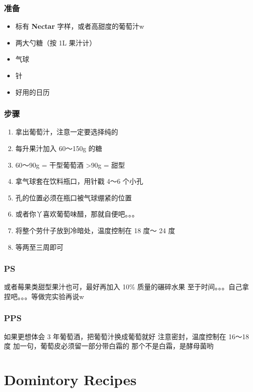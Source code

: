 \documentclass[12pt, a4paper]{ctexart}
\begin{document}
\subsubsection{准备}
\begin{itemize}
    \item{标有 \textbf{Nectar} 字样，或者高甜度的葡萄汁w}
    \item{两大勺糖（按 1L 果汁计）}
    \item{气球}
    \item{针}
    \item{好用的日历}
\end{itemize}

\subsubsection{步骤}
\begin{enumerate}[start=0]
    \item{拿出葡萄汁，注意一定要选择纯的}
    \item{每升果汁加入 60～150g 的糖}
    \item{60～90g = 干型葡萄酒 >90g = 甜型}
    \item{拿气球套在饮料瓶口，用针戳 4～6 个小孔}
    \item{孔的位置必须在瓶口被气球绷紧的位置}
    \item{或者你丫喜欢葡萄味醋，那就自便吧。。。}
    \item{将整个劳什子放到冷暗处，温度控制在 18 度～ 24 度}
    \item{等两至三周即可}
\end{enumerate}

\subsubsection{PS}
或者莓果类甜型果汁也可，最好再加入 10\% 质量的碾碎水果
至于时间。。。自己拿捏吧。。。等做完实验再说w

\subsubsection{PPS}
如果更想体会 3 年葡萄酒，把葡萄汁换成葡萄就好
注意密封，温度控制在 16～18 度
加一句，葡萄皮必须留一部分带白霜的
那个不是白霜，是酵母菌哟

\newpage
\section{Domintory Recipes}
\end{document}
